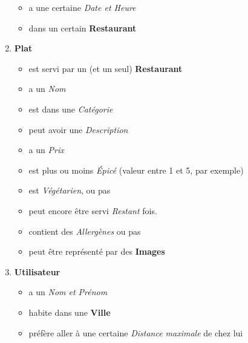 \documentclass[10pt,a4paper]{article}
\begin{document}
\begin{enumerate}
\begin{itemize}
		\item a une certaine \textit{Date et Heure}
		\item dans un certain \textbf{Restaurant}
	\end{itemize}
\item \textbf{Plat}
	\begin{itemize}
		\item est servi par un (et un seul) \textbf{Restaurant}
		\item a un \textit{Nom}
		\item est dans une \textit{Catégorie}
		\item peut avoir une \textit{Description}
		\item a un \textit{Prix}
		\item est plus ou moins \textit{Épicé} (valeur entre 1 et 5, par exemple)
		\item est \textit{Végétarien}, ou pas
		\item peut encore être servi \textit{Restant} fois.
		\item contient des \textit{Allergènes} ou pas
		\item peut être représenté par des \textbf{Images}
	\end{itemize}
\item \textbf{Utilisateur}
	\begin{itemize}
		\item a un \textit{Nom et Prénom}
		\item habite dans une \textbf{Ville}
		\item préfère aller à une certaine \textit{Distance maximale} de chez lui

\end{itemize}
\end{enumerate}
\end{document}
